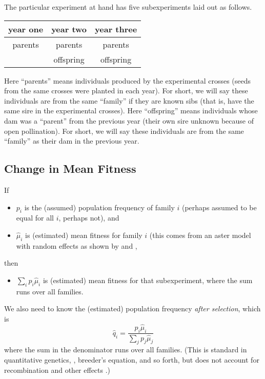 \documentclass[11pt]{article}
\begin{document}
The particular experiment at hand has five subexperiments laid out as follows.
\begin{center}
\begin{tabular}{ccc}
\toprule
year one & year two & year three \\
\midrule
parents & parents & parents \\
        & offspring & offspring \\
\bottomrule
\end{tabular}
\end{center}
Here ``parents'' means individuals produced by the experimental crosses
(seeds from
the same crosses were planted in each year).  For short, we will say these
individuals are from the same ``family'' if they are known sibs
(that is, have the same sire in the experimental crosses).
Here ``offspring'' means individuals whose dam was a ``parent'' from the
previous year (their own sire unknown because of open pollination).
For short, we will say these
individuals are from the same ``family'' as their dam in the previous year.

\subsection{Change in Mean Fitness}

If
\begin{itemize}
\item $p_i$ is the (assumed) population frequency of family $i$
    (perhaps assumed to be equal for all $i$, perhaps not), and
\item $\hat{\mu}_i$ is (estimated) mean fitness for family $i$
    (this comes from an aster model with random effects as shown by
    \citet{kulbaba} and \citet{zenodo},
\end{itemize}
then
\begin{itemize}
\item $\sum_i p_i \hat{\mu}_i$ is (estimated) mean fitness for
that subexperiment, where the sum runs over all families.
\end{itemize}

We also need to know the (estimated) population frequency
\emph{after selection}, which is
\begin{equation*}
   \hat{q}_i = \frac{p_i \hat{\mu}_i}{\sum_j p_j \hat{\mu}_j}
\end{equation*}
where the sum in the denominator runs over all families.
(This is standard in quantitative genetics, \citet{lande-arnold},
breeder's equation,
and so forth, but does not account for recombination and other effects
\citep{pr70,pr72}.)
\end{document}
